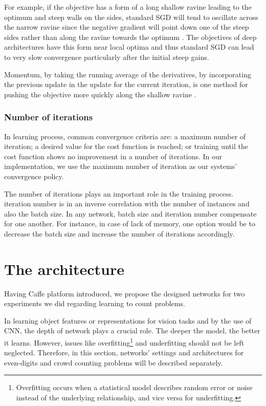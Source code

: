 For example, if the objective has a form of a long shallow ravine leading to the optimum and steep walls on the sides, standard SGD will tend to oscillate across the narrow ravine since the negative gradient will point down one of the steep sides rather than along the ravine towards the optimum \cite{sgd}. The objectives of deep architectures have this form near local optima and thus standard SGD can lead to very slow convergence particularly after the initial steep gains. 

Momentum, by taking the running average of the derivatives, by incorporating the previous update in the update for the current iteration, is one method for pushing the objective more quickly along the shallow ravine \cite{sgd}. 

\subsubsection{Number of iterations}

In learning process, common convergence criteria are: a maximum number of iteration; a desired value for the cost function is reached; or training until the cost function shows no improvement in a number of iterations. In our implementation, we use the maximum number of iteration as our systems' convergence policy. 
 
The number of iterations plays an important role in the training process. iteration number is in an inverse correlation with the number of instances and also the batch size. In any network, batch size and iteration number compensate for one another. For instance, in case of lack of memory, one option would be to decrease the batch size and increase the number of iterations accordingly.


\section{The architecture}
\label{imparch}
Having Caffe platform introduced, we propose the designed networks for two experiments we did regarding learning to count problems.

In learning object features or representations for vision tasks and by the use of CNN, the depth of network plays a crucial role. The deeper the model, the better it learns. However, issues like overfitting\footnote{Overfitting occurs when a statistical model describes random error or noise instead of the underlying relationship, and vice versa for underfitting. } and underfitting should not be left neglected.   
Therefore, in this section, networks' settings and architectures for even-digits and crowd counting problems will be described separately. 

